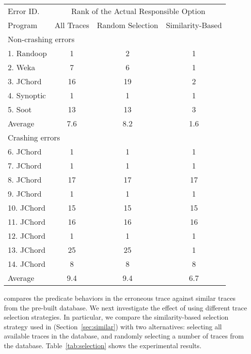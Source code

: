\begin{table}[t]
\setlength{\tabcolsep}{.24\tabcolsep}
\begin{tabular}{|l|c|c||c|}
\hline
 Error ID. & \multicolumn{3}{|c|}{Rank of the Actual Responsible Option } \\
\cline{2-4}
 Program & All Traces & Random Selection&  Similarity-Based\\
 \hline
\hline
\multicolumn{4}{|l|}{Non-crashing errors}   \\
 \hline
 1. Randoop & 1 & 2 & 1\\
 2. Weka & 7 & 6 & 1\\
 3. JChord & 16 & 19 & 2\\
 4. Synoptic & 1 & 1 & 1\\
 5. Soot & 13 & 13 & 3\\
\hline
Average & 7.6 & 8.2 & 1.6 \\
\hline
\hline
\multicolumn{4}{|l|}{Crashing errors}   \\
\hline
 6. JChord & 1 & 1 &1\\
 7. JChord & 1 & 1 &1\\
 8. JChord & 17 & 17 &17\\
 9. JChord & 1 &  1&1\\
 10. JChord & 15 & 15 &15\\
 11. JChord & 16 & 16 &16\\
 12. JChord & 1 & 1 &1\\
 13. JChord & 25 & 25 &1\\
 14. JChord & 8 & 8 &8\\
\hline
Average & 9.4 & 9.4 & 6.7\\
\hline
\end{tabular}

\end{table}


\ourtool compares the predicate behaviors in the erroneous trace against
similar traces from the pre-built database.
We next investigate the effect of using different trace selection strategies.
In particular, we compare the similarity-based selection strategy used in \ourtool
 (Section~\ref{sec:similar}) with two alternatives: selecting
all available traces in the database, and
randomly selecting a number of traces from the database.
Table~\ref{tab:selection} shows the experimental results.

